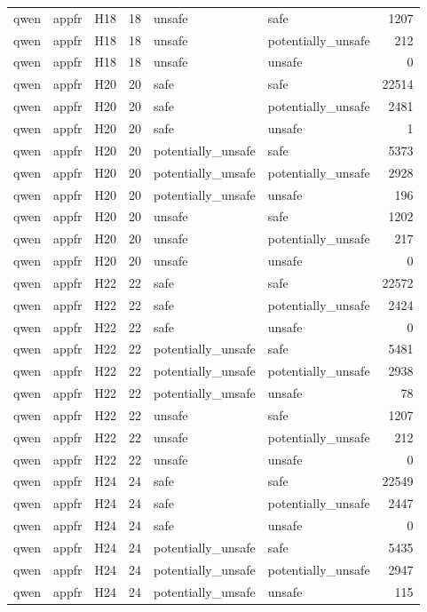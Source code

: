 \begin{table}[tbp]
\begin{tabular}{lllrllr}
qwen & appfr & H18 & 18 & unsafe & safe & 1207 \\
qwen & appfr & H18 & 18 & unsafe & potentially\_unsafe & 212 \\
qwen & appfr & H18 & 18 & unsafe & unsafe & 0 \\
qwen & appfr & H20 & 20 & safe & safe & 22514 \\
qwen & appfr & H20 & 20 & safe & potentially\_unsafe & 2481 \\
qwen & appfr & H20 & 20 & safe & unsafe & 1 \\
qwen & appfr & H20 & 20 & potentially\_unsafe & safe & 5373 \\
qwen & appfr & H20 & 20 & potentially\_unsafe & potentially\_unsafe & 2928 \\
qwen & appfr & H20 & 20 & potentially\_unsafe & unsafe & 196 \\
qwen & appfr & H20 & 20 & unsafe & safe & 1202 \\
qwen & appfr & H20 & 20 & unsafe & potentially\_unsafe & 217 \\
qwen & appfr & H20 & 20 & unsafe & unsafe & 0 \\
qwen & appfr & H22 & 22 & safe & safe & 22572 \\
qwen & appfr & H22 & 22 & safe & potentially\_unsafe & 2424 \\
qwen & appfr & H22 & 22 & safe & unsafe & 0 \\
qwen & appfr & H22 & 22 & potentially\_unsafe & safe & 5481 \\
qwen & appfr & H22 & 22 & potentially\_unsafe & potentially\_unsafe & 2938 \\
qwen & appfr & H22 & 22 & potentially\_unsafe & unsafe & 78 \\
qwen & appfr & H22 & 22 & unsafe & safe & 1207 \\
qwen & appfr & H22 & 22 & unsafe & potentially\_unsafe & 212 \\
qwen & appfr & H22 & 22 & unsafe & unsafe & 0 \\
qwen & appfr & H24 & 24 & safe & safe & 22549 \\
qwen & appfr & H24 & 24 & safe & potentially\_unsafe & 2447 \\
qwen & appfr & H24 & 24 & safe & unsafe & 0 \\
qwen & appfr & H24 & 24 & potentially\_unsafe & safe & 5435 \\
qwen & appfr & H24 & 24 & potentially\_unsafe & potentially\_unsafe & 2947 \\
qwen & appfr & H24 & 24 & potentially\_unsafe & unsafe & 115 \\

\end{tabular}
\end{table}
